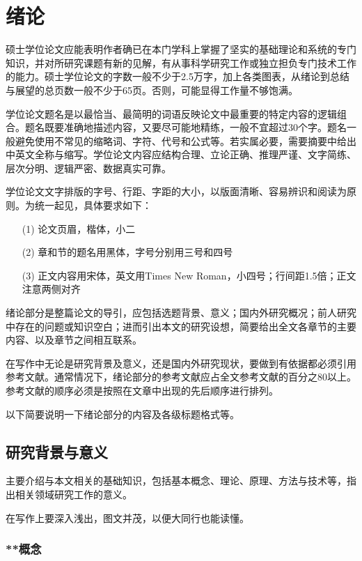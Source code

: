 
\chapter{绪论}
\label{cha:intro}

硕士学位论文应能表明作者确已在本门学科上掌握了坚实的基础理论和系统的专门知识，并对所研究课题有新的见解，有从事科学研究工作或独立担负专门技术工作的能力。硕士学位论文的字数一般不少于2.5万字，加上各类图表，从绪论到总结与展望的总页数一般不少于65页。否则，可能显得工作量不够饱满。

学位论文题名是以最恰当、最简明的词语反映论文中最重要的特定内容的逻辑组合。题名既要准确地描述内容，又要尽可能地精练，一般不宜超过30个字。题名一般避免使用不常见的缩略词、字符、代号和公式等。若实属必要，需要摘要中给出中英文全称与缩写。学位论文内容应结构合理、立论正确、推理严谨、文字简练、层次分明、逻辑严密、数据真实可靠。

学位论文文字排版的字号、行距、字距的大小，以版面清晰、容易辨识和阅读为原则。为统一起见，具体要求如下：
\begin{enumerate}
    \item[(1)] 论文页眉，楷体，小二
    \item[(2)] 章和节的题名用黑体，字号分别用三号和四号
    \item[(3)] 正文内容用宋体，英文用Times New Roman，小四号；行间距1.5倍；正文注意两侧对齐
\end{enumerate}

绪论部分是整篇论文的导引，应包括选题背景、意义；国内外研究概况；前人研究中存在的问题或知识空白；进而引出本文的研究设想，简要给出全文各章节的主要内容、以及章节之间相互联系。

在写作中无论是研究背景及意义，还是国内外研究现状，要做到有依据都必须引用参考文献。通常情况下，绪论部分的参考文献应占全文参考文献的百分之80以上。参考文献的顺序必须是按照在文章中出现的先后顺序进行排列。

以下简要说明一下绪论部分的内容及各级标题格式等。


\section{研究背景与意义}
\label{sec:general intro}
主要介绍与本文相关的基础知识，包括基本概念、理论、原理、方法与技术等，指出相关领域研究工作的意义。

在写作上要深入浅出，图文并茂，以便大同行也能读懂。

\subsection{**概念}

